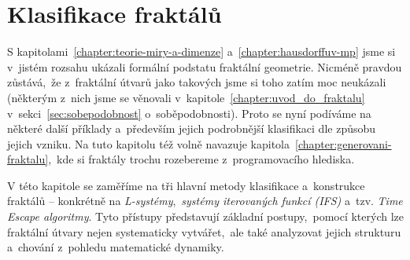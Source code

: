 \chapter{Klasifikace fraktálů}\label{chapter:klasifikace-fraktalu}

S kapitolami~\ref{chapter:teorie-miry-a-dimenze} a~\ref{chapter:hausdorffuv-mp} jsme si v~jistém rozsahu ukázali formální podstatu fraktální geometrie. Nicméně pravdou zůstává,~že z~fraktální útvarů jako takových jsme si toho zatím moc neukázali (některým z~nich jsme se věnovali v~kapitole~\ref{chapter:uvod_do_fraktalu} v~sekci~\ref{sec:sobepodobnost} o~soběpodobnosti). Proto se nyní podíváme na některé další příklady a~především jejich podrobnější klasifikaci dle způsobu jejich vzniku. Na tuto kapitolu též volně navazuje kapitola~\ref{chapter:generovani-fraktalu},~kde si fraktály trochu rozebereme z~programovacího hlediska.

V této kapitole se zaměříme na tři hlavní metody klasifikace a~konstrukce fraktálů -- konkrétně na \emph{L-systémy},~\emph{systémy iterovaných funkcí (IFS)} a~tzv. \emph{Time Escape algoritmy}. Tyto přístupy představují základní postupy,~pomocí kterých lze fraktální útvary nejen systematicky vytvářet,~ale také analyzovat jejich strukturu a~chování z~pohledu matematické dynamiky.



